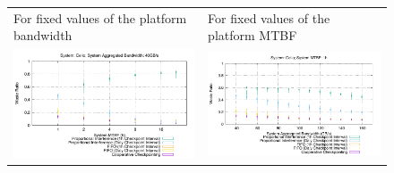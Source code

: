 \documentclass[conference]{IEEEtran}
\begin{document}
\begin{figure}[t]
\noindent\begin{tabular}{C{.5\linewidth}C{.5\linewidth}}
For fixed values of the platform bandwidth & For fixed values of the platform MTBF \\
\includegraphics[width=\linewidth]{sim/figures/synthetic-040gbs-waste-celio.pdf} & \includegraphics[width=\linewidth]{sim/figures/synthetic-01hMTBF-waste-celio.pdf} \\

\end{tabular}
\end{figure}
\end{document}
